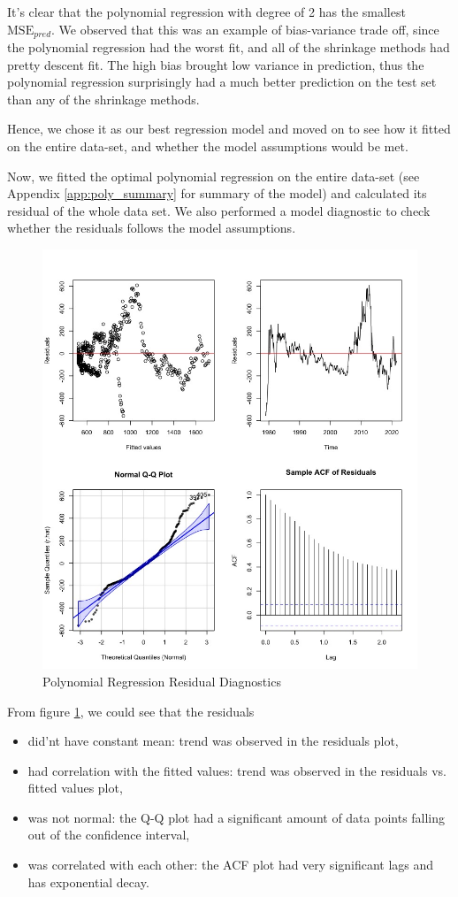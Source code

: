 \documentclass[paper=letter, fontsize=11pt]{scrartcl}
\begin{document}
It's clear that the polynomial regression with degree of 2 has the smallest $\mathrm{MSE}_{pred}$. 
We observed that this was an example of bias-variance trade off, since the polynomial regression had the worst fit, and all of the shrinkage methods had pretty descent fit. The high bias brought low variance in prediction, thus the polynomial regression surprisingly had a much better prediction on the test set than any of the shrinkage methods.

Hence, we chose it as our best regression model and moved on to see how it fitted on the entire data-set, and whether the model assumptions would be met.

Now, we fitted the optimal polynomial regression on the entire data-set (see Appendix \ref{app:poly_summary} for summary of the model) and calculated its residual of the whole data set. We also performed a model diagnostic to check whether the residuals follows the model assumptions.

\begin{figure}[ht]
    \centering
    \includegraphics[width=0.6\linewidth]{Image/poly-res-diagnostic.jpeg}
    \caption{Polynomial Regression Residual Diagnostics}
    \label{fig:poly-res-diag}
\end{figure}

From figure \ref{fig:poly-res-diag}, we could see that the residuals 
\begin{itemize}
    \item did'nt have constant mean: trend was observed in the residuals plot,
    \item had correlation with the fitted values: trend was observed in the residuals vs. fitted values plot,
    \item was not normal: the Q-Q plot had a significant amount of data points falling out of the confidence interval,
    \item was correlated with each other: the ACF plot had very significant lags and has exponential decay.
\end{itemize}
\end{document}
